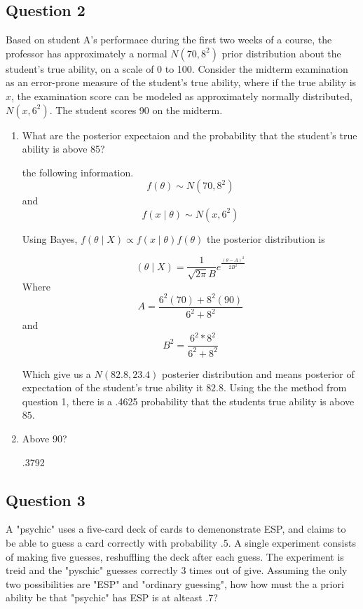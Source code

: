 \documentclass{tufte-book}
\theoremstyle{mytheoremstyle}
\theoremstyle{mylemstyle}
\theoremstyle{mydefstyle}
\begin{document}
\subsection{Question 2}
Based on student A's performace during the first two weeks of a course, the professor has approximately a normal $N(70, 8^2)$ prior distribution about the student's true ability, on a scale of 0 to 100.  Consider the midterm examination as an error-prone measure of the student's true ability, where if the true ability is $x$, the examination score can be modeled as approximately normally distributed, $N(x,6^2)$.  The student scores 90 on the midterm.

\begin{enumerate}
\item What are the posterior expectaion and the probability that the student's true ability is above 85?

 the following information.
    \[f(\theta) \sim N(70, 8^2) \]
 and
    \[f(x\mid \theta)\sim N(x, 6^2)\]

Using Bayes, $f(\theta\mid X) \propto f(x\mid \theta)f(\theta)$ the posterior distribution is

\[ (\theta\mid X) = \frac{1}{\sqrt{2\pi}B}e^{\frac{(\theta-A)^2}{2B^2}} \]
Where
\[ A = \frac{6^2(70) + 8^2(90)}{6^2 + 8^2} \]
and
\[B^2 = \frac{6^2*8^2}{6^2 + 8^2} \]

Which give us a $N(82.8, 23.4)$ posterier distribution and means posterior of expectation of the student's true ability it $82.8$.  Using the the method from question 1, there is a .4625 probability that the students true ability is above $85$.

\item Above 90?

.3792

\end{enumerate}


\subsection{Question 3}
A "psychic" uses a five-card deck of cards to demenonstrate ESP, and claims to be able to guess a card correctly with probability .5.  A single experiment consists of making five guesses, reshuffling the deck after each guess.  The experiment is treid and the "pyschic" guesses correctly 3 times out of give.  Assuming the only two possibilities are "ESP" and "ordinary guessing", how how must the a priori ability be that "psychic" has ESP is at alteast .7?
\end{document}
